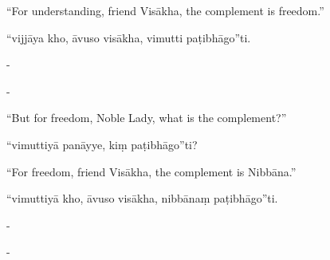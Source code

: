 \begin{samepage}
\begin{leftcolumn*}
“For understanding, friend Visākha, the complement is freedom.”
\end{leftcolumn*}

\begin{rightcolumn}
“vijjāya kho, āvuso visākha, vimutti paṭibhāgo”ti.
\end{rightcolumn}
\end{samepage}

\begin{samepage}
\begin{leftcolumn*}
-
\end{leftcolumn*}

\begin{rightcolumn}
-
\end{rightcolumn}
\end{samepage}

\begin{samepage}
\begin{leftcolumn*}
“But for freedom, Noble Lady, what is the complement?”
\end{leftcolumn*}

\begin{rightcolumn}
“vimuttiyā panāyye, kiṃ paṭibhāgo”ti?
\end{rightcolumn}
\end{samepage}

\begin{samepage}
\begin{leftcolumn*}
“For freedom, friend Visākha, the complement is Nibbāna.”
\end{leftcolumn*}

\begin{rightcolumn}
“vimuttiyā kho, āvuso visākha, nibbānaṃ paṭibhāgo”ti.
\end{rightcolumn}
\end{samepage}

\begin{samepage}
\begin{leftcolumn*}
-
\end{leftcolumn*}

\begin{rightcolumn}
-
\end{rightcolumn}
\end{samepage}

